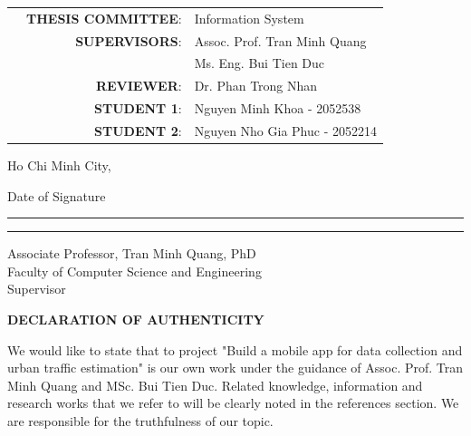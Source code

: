 \documentclass[a4paper]{article}
\begin{document}
\begin{titlepage}
\begin{center}
\begin{table}[h]
    \large
    \begin{tabular}{r r l}
    \hspace{2 cm} & \textbf{THESIS COMMITTEE}: & Information System \\
    & \textbf{SUPERVISORS}: & Assoc. Prof. Tran Minh Quang \\ 
    & & Ms. Eng. Bui Tien Duc\\
    & \textbf{REVIEWER}: & Dr. Phan Trong Nhan \\
    & \textbf{STUDENT 1}: & Nguyen Minh Khoa - 2052538\\
    & \textbf{STUDENT 2}: & Nguyen Nho Gia Phuc - 2052214 \\ 
    \end{tabular}
\end{table}
\vspace{2cm}

Ho Chi Minh City, \DTMtoday

\end{center}
\end{titlepage}


\bigskip  \hfill \parbox{1.3in}{Date of Signature}  
\vspace{2\baselineskip}  
\newline
\noindent\rule{4in}{0.7pt} \hfill \rule{1.5in}{0.7pt}  
\newline
\newline
\noindent Associate Professor, Tran Minh Quang, PhD\\ 
Faculty of Computer Science and Engineering\\ 
Supervisor

\newpage
\begin{center}
    \Large{\textbf{DECLARATION OF AUTHENTICITY}}
\end{center}
We would like to state that to project "Build a mobile app for data collection and urban traffic estimation" is our own work under the guidance of Assoc. Prof. Tran Minh Quang and MSc. Bui Tien Duc. Related knowledge, information and research works that we refer to will be clearly noted in the references section.
We are responsible for the truthfulness of our topic.
\end{document}
